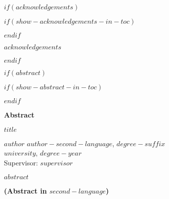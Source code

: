 \documentclass[letterpaper, $if(page-layout)$$page-layout$$else$nobind$endif$]{templates/ociamthesis}
\begin{document}
\begin{romanpages}
$if(acknowledgements)$

$if(show-acknowledgements-in-toc)$
\renewcommand{\numberstyleacks}{plain}
\renewcommand{\numberstyleabstract}{plain}
$endif$

\begin{acknowledgements}
 	$acknowledgements$
\end{acknowledgements}

$endif$


$if(abstract)$

$if(show-abstract-in-toc)$
\renewcommand{\numberstyleabstract}{plain}
$endif$


\begin{center}
  \textbf{Abstract}\\
  
  \vspace{18pt}
  
  \begin{spacing}{2}
    {\Large{\textbf{$title$}}}
  \end{spacing}

  \vspace{18pt}

  \begin{spacing}{1.4}
    $author$ 
    {\secondlanguage $author-second-language$}, 
    $degree-suffix$\\
    $university$, 
    $degree-year$\\
    \vspace{18pt}
    Supervisor: $supervisor$
  \end{spacing}

\end{center}

\begin{spacing}{1.5}
  \indent
  $abstract$
\end{spacing}


\newpage
\begin{center}
  \textbf{ (Abstract in $second-language$)}\\
  

\end{center}
\end{romanpages}
\end{document}
